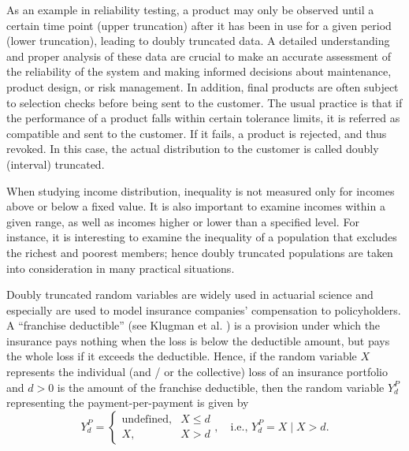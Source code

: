 \documentclass[11pt]{article}
\begin{document}
As an example in reliability testing, a product may only be observed until a certain time point (upper truncation) after it has been in use for a given period (lower truncation), leading to doubly truncated data. A detailed understanding and proper analysis of these data are crucial to make an accurate assessment of the reliability of the system and making informed decisions about maintenance, product design, or risk management. In addition, final products are often subject to selection checks before being sent to the customer. The usual practice is that if the performance of a product falls within certain tolerance limits, it is referred as compatible and sent to the customer. If it fails, a product is rejected, and thus revoked. In this case, the actual distribution to the customer is called doubly (interval) truncated.

When studying income distribution, inequality is not measured only for incomes above or below a fixed value. It is also important to examine incomes within a given range, as well as incomes higher or lower than a specified level. For instance, it is interesting to examine the inequality of a population that excludes the richest and poorest members; hence doubly truncated populations are taken into consideration in many practical situations.

Doubly truncated random variables are widely used in actuarial science and especially are used to model insurance companies' compensation to policyholders. A “franchise deductible” (see Klugman et al. \cite{Klugman2019}) is a provision under which the insurance pays nothing when the loss is below the deductible amount, but pays the whole loss if it exceeds the deductible. Hence, if the random variable $X$ represents the individual (and / or the collective) loss of an insurance portfolio and $d > 0$ is the amount of the franchise deductible, then the random variable $Y_d^P$ representing the payment-per-payment is given by
{\small $$ Y_d^P = \begin{cases}
		\text{undefined}, & X \leq d \\
		X, & X > d
	\end{cases}, \quad \text{i.e., } Y_d^P = X \mid X > d.
	$$}
\end{document}

